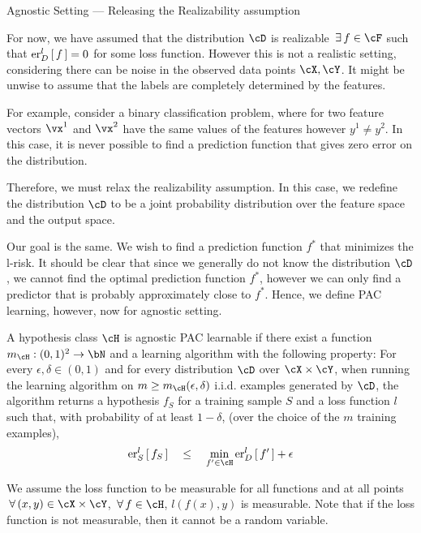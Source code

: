 \documentclass[11pt,a4paper]{article}
\begin{document}
\begin{ssection}{Agnostic Setting --- Releasing the Realizability assumption}

	For now, we have assumed that the distribution $\cD$ is realizable  $\qexists f \in \cF$ such that $\err[_D^l]{f} = 0$ for some loss function. However this is not a realistic setting, considering there can be noise in the observed data points $\cX, \cY$. It might be unwise to assume that the labels are completely determined by the features. \br

	For example, consider a binary classification problem, where for two feature vectors $\vx^1$ and $\vx^2$ have the same values of the features however $y^1 \ne y^2$. In this case, it is never possible to find a prediction function that gives zero error on the distribution. \br

	Therefore, we must relax the realizability assumption. In this case, we redefine the distribution $\cD$ to be a joint probability distribution over the feature space and the output space. \br

	Our goal is the same. We wish to find a prediction function $f^\ast$ that minimizes the l-risk. It should be clear that since we generally do not know the distribution $\cD$, we cannot find the optimal prediction function $f^\ast$, however we can only find a predictor that is probably approximately close to $f^\ast$. Hence, we define PAC learning, however, now for agnostic setting. \br

	\begin{definition}
		A hypothesis class $\cH$ is agnostic PAC learnable if there exist a function $m_\cH : (0, 1)^2 \ra \bN$ and a learning algorithm with the following property: For every $\epsilon, \delta \in (0, 1)$ and for every distribution $\cD$ over $\cX \times \cY$, when running the learning algorithm on $m \ge m_\cH (\epsilon, \delta)$ i.i.d. examples generated by $\cD$, the algorithm returns a hypothesis $f_S$ for a training sample $S$ and a loss function $l$ such that, with probability of at least $1 - \delta$, (over the choice of the $m$ training examples),
		\begin{align*}
			\err[_S^l]{f_S}	\qle	\min_{f' \in \cH} \err[_D^l]{f'} + \epsilon
		\end{align*}
	\end{definition}


	\begin{remark}
		We assume the loss function to be measurable for all functions and at all points  $\qforall (x, y) \in \cX \times \cY$, $\qforall f \in \cH$, $l(f(x), y)$ is measurable. Note that if the loss function is not measurable, then it cannot be a random variable.
	\end{remark}
\end{ssection}



\end{document}
